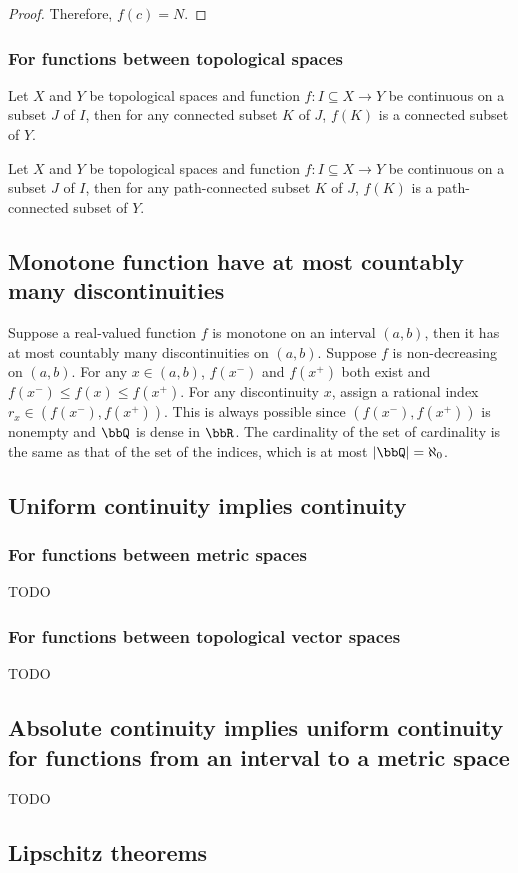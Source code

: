 \documentclass[a4paper,12pt]{report}
\begin{document}
\begin{itemize}
\begin{itemize}
\begin{proof}
Therefore, $f(c)=N$.
\end{proof}
\subsubsection{For functions between topological spaces}
Let $X$ and $Y$ be topological spaces and function $f\colon I\subseteq X\to Y$ be continuous on a subset $J$ of $I$, then for any connected subset $K$ of $J$, $f(K)$ is a connected subset of $Y$.

Let $X$ and $Y$ be topological spaces and function $f\colon I\subseteq X\to Y$ be continuous on a subset $J$ of $I$, then for any path-connected subset $K$ of $J$, $f(K)$ is a path-connected subset of $Y$.
\subsection{Monotone function have at most countably many discontinuities}
Suppose a real-valued function $f$ is monotone on an interval $(a,b)$, then it has at most countably many discontinuities on $(a,b)$.
\bpr
Suppose $f$ is non-decreasing on $(a,b)$. For any $x\in(a,b)$, $f(x^-)$ and $f(x^+)$ both exist and $f(x^-)\leq f(x)\leq f(x^+)$. For any discontinuity $x$, assign a rational index $r_x\in(f(x^-),f(x^+))$. This is always possible since $(f(x^-),f(x^+))$ is nonempty and $\bbQ$ is dense in $\bbR$. The cardinality of the set of cardinality is the same as that of the set of the indices, which is at most $|\bbQ|=\aleph_0$.
\epr
\subsection{Uniform continuity implies continuity}
\subsubsection{For functions between metric spaces}
TODO
\subsubsection{For functions between topological vector spaces}
TODO
\subsection{Absolute continuity implies uniform continuity for functions from an interval to a metric space}
TODO
\subsection{Lipschitz theorems}

\end{itemize}
\end{itemize}
\end{document}
